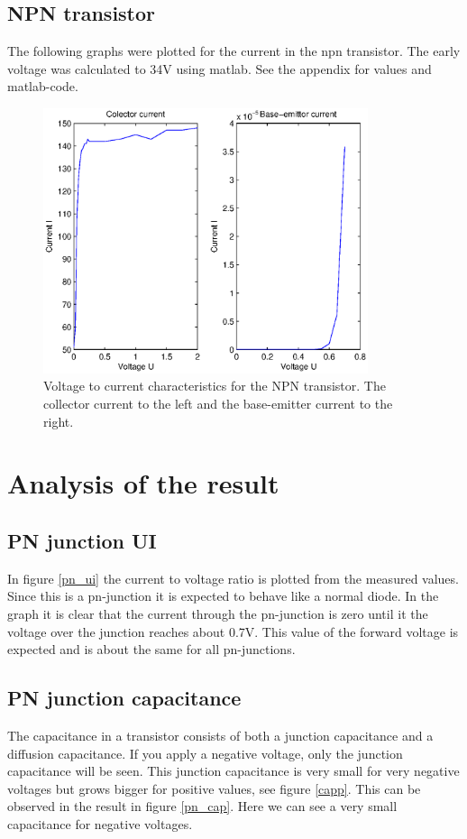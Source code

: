 \documentclass[a4paper]{article}
\begin{document}
\subsection{NPN transistor}
The following graphs were plotted for the current in the npn transistor. The early voltage was calculated to 34V using matlab. See the appendix for values and matlab-code.
\begin{figure}[H]
	\centering
	\includegraphics[width=0.85\textwidth]{npn.eps}
	\caption{Voltage to current characteristics for the NPN transistor. The collector current to the left and the base-emitter current to the right.}	
	\label{npn}
\end{figure}

\newpage
\section{Analysis of the result}
\subsection{PN junction UI}
In figure \ref{pn_ui} the current to voltage ratio is plotted from the measured values. Since this is a pn-junction it is expected to behave like a normal diode. In the graph it is clear that the current through the pn-junction is zero until it the voltage over the junction reaches about 0.7V. This value of the forward voltage is expected and is about the same for all pn-junctions.

\subsection{PN junction capacitance}
The capacitance in a transistor consists of both a junction capacitance and a diffusion capacitance. If you apply a negative voltage, only the junction capacitance will be seen. This junction capacitance is very small for very negative voltages but grows bigger for positive values, see figure \ref{capp}. This can be observed in the result in figure \ref{pn_cap}. Here we can see a very small capacitance for negative voltages.
\end{document}
